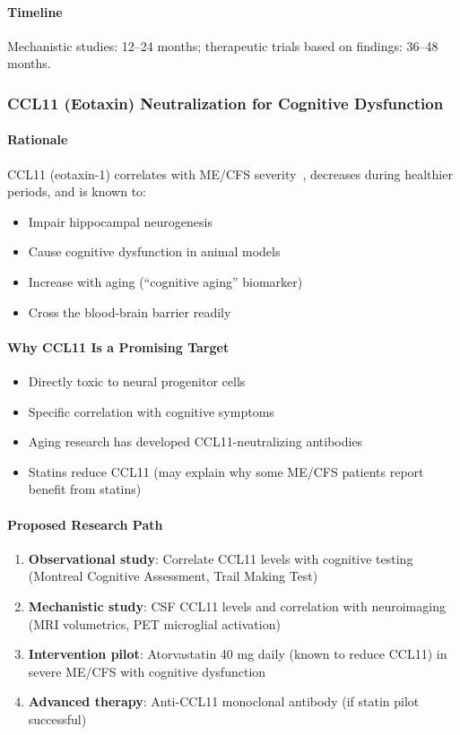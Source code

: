 \paragraph{Timeline}
Mechanistic studies: 12--24 months; therapeutic trials based on findings: 36--48 months.

\subsubsection{CCL11 (Eotaxin) Neutralization for Cognitive Dysfunction}

\paragraph{Rationale}
CCL11 (eotaxin-1) correlates with ME/CFS severity~\cite{Montoya2017}, decreases during healthier periods, and is known to:
\begin{itemize}
    \item Impair hippocampal neurogenesis
    \item Cause cognitive dysfunction in animal models
    \item Increase with aging (``cognitive aging'' biomarker)
    \item Cross the blood-brain barrier readily
\end{itemize}

\paragraph{Why CCL11 Is a Promising Target}
\begin{itemize}
    \item Directly toxic to neural progenitor cells
    \item Specific correlation with cognitive symptoms
    \item Aging research has developed CCL11-neutralizing antibodies
    \item Statins reduce CCL11 (may explain why some ME/CFS patients report benefit from statins)
\end{itemize}

\paragraph{Proposed Research Path}
\begin{enumerate}
    \item \textbf{Observational study}: Correlate CCL11 levels with cognitive testing (Montreal Cognitive Assessment, Trail Making Test)
    \item \textbf{Mechanistic study}: CSF CCL11 levels and correlation with neuroimaging (MRI volumetrics, PET microglial activation)
    \item \textbf{Intervention pilot}: Atorvastatin 40 mg daily (known to reduce CCL11) in severe ME/CFS with cognitive dysfunction
    \item \textbf{Advanced therapy}: Anti-CCL11 monoclonal antibody (if statin pilot successful)
\end{enumerate}

